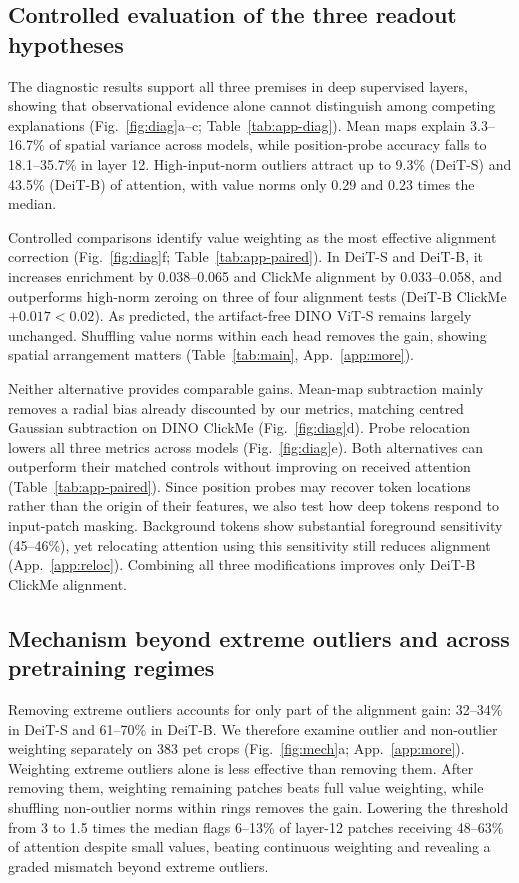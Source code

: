 \documentclass{article}
\begin{document}
\subsection{Controlled evaluation of the three readout hypotheses}
\label{sec:results}
The diagnostic results support all three premises in deep supervised layers, showing that observational evidence alone cannot distinguish among competing explanations (Fig.~\ref{fig:diag}a--c; Table~\ref{tab:app-diag}). Mean maps explain 3.3--16.7\% of spatial variance across models, while position-probe accuracy falls to 18.1--35.7\% in layer 12. High-input-norm outliers attract up to 9.3\% (DeiT-S) and 43.5\% (DeiT-B) of attention, with value norms only 0.29 and 0.23 times the median.

Controlled comparisons identify value weighting as the most effective alignment correction (Fig.~\ref{fig:diag}f; Table~\ref{tab:app-paired}). In DeiT-S and DeiT-B, it increases enrichment by 0.038--0.065 and ClickMe alignment by 0.033--0.058, and outperforms high-norm zeroing on three of four alignment tests (DeiT-B ClickMe $+0.017 < 0.02$). As predicted, the artifact-free DINO ViT-S remains largely unchanged. Shuffling value norms within each head removes the gain, showing spatial arrangement matters (Table~\ref{tab:main}, App.~\ref{app:more}).

Neither alternative provides comparable gains. Mean-map subtraction mainly removes a radial bias already discounted by our metrics, matching centred Gaussian subtraction on DINO ClickMe (Fig.~\ref{fig:diag}d). Probe relocation lowers all three metrics across models (Fig.~\ref{fig:diag}e). Both alternatives can outperform their matched controls without improving on received attention (Table~\ref{tab:app-paired}). Since position probes may recover token locations rather than the origin of their features, we also test how deep tokens respond to input-patch masking. Background tokens show substantial foreground sensitivity (45--46\%), yet relocating attention using this sensitivity still reduces alignment (App.~\ref{app:reloc}). Combining all three modifications improves only DeiT-B ClickMe alignment.

\subsection{Mechanism beyond extreme outliers and across pretraining regimes}
\label{sec:mech}
Removing extreme outliers accounts for only part of the alignment gain: 32--34\% in DeiT-S and 61--70\% in DeiT-B. We therefore examine outlier and non-outlier weighting separately on 383 pet crops (Fig.~\ref{fig:mech}a; App.~\ref{app:more}). Weighting extreme outliers alone is less effective than removing them. After removing them, weighting remaining patches beats full value weighting, while shuffling non-outlier norms within rings removes the gain. Lowering the threshold from 3 to 1.5 times the median flags 6--13\% of layer-12 patches receiving 48--63\% of attention despite small values, beating continuous weighting and revealing a graded mismatch beyond extreme outliers.
\end{document}
